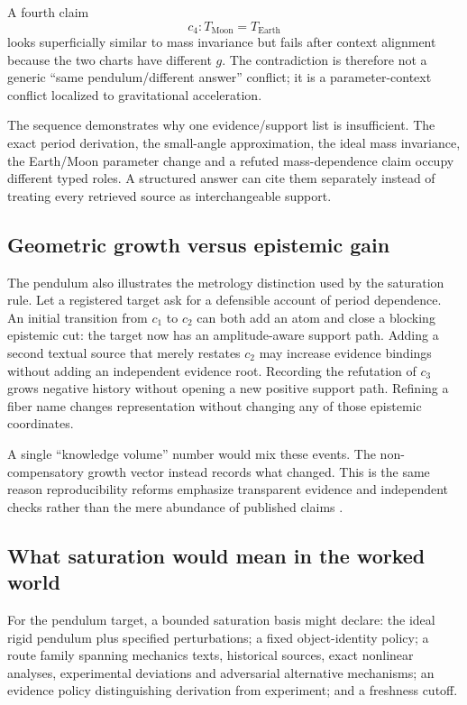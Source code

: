 A fourth claim
\[
c_4:T_{\mathrm{Moon}}=T_{\mathrm{Earth}}
\]
looks superficially similar to mass invariance but fails after context alignment because the two charts have different \(g\). The contradiction is therefore not a generic ``same pendulum/different answer'' conflict; it is a parameter-context conflict localized to gravitational acceleration.

The sequence demonstrates why one evidence/support list is insufficient. The exact period derivation, the small-angle approximation, the ideal mass invariance, the Earth/Moon parameter change and a refuted mass-dependence claim occupy different typed roles. A structured answer can cite them separately instead of treating every retrieved source as interchangeable support.

\subsection{Geometric growth versus epistemic gain}

The pendulum also illustrates the metrology distinction used by the saturation rule. Let a registered target ask for a defensible account of period dependence. An initial transition from \(c_1\) to \(c_2\) can both add an atom and close a blocking epistemic cut: the target now has an amplitude-aware support path. Adding a second textual source that merely restates \(c_2\) may increase evidence bindings without adding an independent evidence root. Recording the refutation of \(c_3\) grows negative history without opening a new positive support path. Refining a fiber name changes representation without changing any of those epistemic coordinates.

A single ``knowledge volume'' number would mix these events. The non-compensatory growth vector instead records what changed. This is the same reason reproducibility reforms emphasize transparent evidence and independent checks rather than the mere abundance of published claims \cite{nosek2015,munafo2017}.

\subsection{What saturation would mean in the worked world}

For the pendulum target, a bounded saturation basis might declare: the ideal rigid pendulum plus specified perturbations; a fixed object-identity policy; a route family spanning mechanics texts, historical sources, exact nonlinear analyses, experimental deviations and adversarial alternative mechanisms; an evidence policy distinguishing derivation from experiment; and a freshness cutoff.

